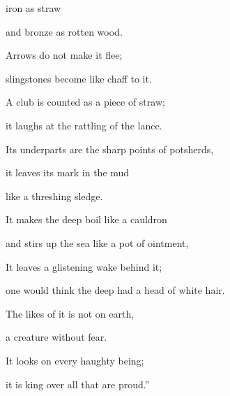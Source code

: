{iron
as
straw
\par }{\Q and bronze
as rotten
wood.
\par }{\Q {}Arrows
do not
make it flee;
\par }{\Q slingstones
become like
chaff to it.
\par }{\Q {}A club
is counted
as a piece of straw;
\par }{\Q it laughs
at the rattling
of the lance.
\par }{\Q {}Its underparts
are the sharp
points of potsherds,
\par }{\Q it leaves its mark
in
the mud
\par }{\Q like a threshing sledge.
\par }{\Q {}It makes the deep
boil
like a cauldron
\par }{\Q and stirs up
the sea
like a pot of ointment,
\par }{\Q {}It leaves a glistening wake
behind
it;
\par }{\Q one would think
the deep
had a head of white hair.
\par }{\Q {}The likes
of it is
not
on
earth,
\par }{\Q a creature without
fear.
\par }{\Q {}It looks
on every
haughty
being;
\par }{\Q it is
king
over
all
that are proud.”

\par }
